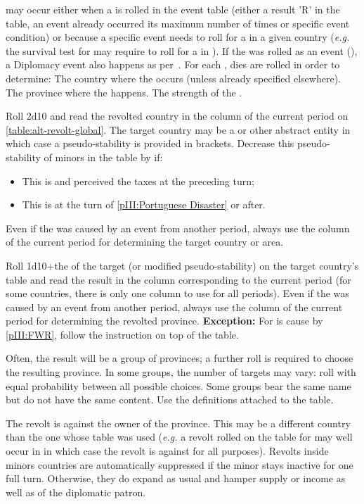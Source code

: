 \aparag \REVOLT may occur either when a \RD is rolled in the event table
(either a result 'R' in the table, an event already occurred its maximum
number of times or specific event condition) or because a specific event
needs to roll for a \REVOLT in a given country (\emph{e.g.} the survival
test for \TUR may require to roll for a \REVOLT in \paysmajeurTurquie).
\aparag If the \REVOLT was rolled as an event (\RD), a Diplomacy event
also happens as per~.
\aparag For each \REVOLT , dies are rolled in order to determine:
\bparag The country where the \REVOLT occurs (unless already specified
elsewhere).
\bparag The province where the \REVOLT happens.
\bparag The strength of the \REVOLT .

\aparag Roll 2d10 and read the revolted country in the column of the
current period on \ref{table:alt-revolt-global}. The target country may
be a \MIN or other abstract entity in which case a pseudo-stability is
provided in brackets.
\bparag Decrease this pseudo-stability of minors in the table by
 if:
\begin{itemize}
\item This is \HOLhol and \SPA perceived the taxes at the preceding
  turn;
\item This is \PORpor at the turn of \ref{pIII:Portuguese Disaster} or
  after.
\end{itemize}
\bparag Even if the \REVOLT was caused by an event from another period,
always use the column of the current period for determining the target
country or area.

\aparag Roll 1d10+the \STAB of the target (or modified
pseudo-stability) on the target country's table and read the result in
the column corresponding to the current period (for some countries,
there is only one column to use for all periods).
\bparag Even if the \REVOLT was caused by an event from another period,
always use the column of the current period for determining the revolted
province.
\bparag \textbf{Exception:} For \REVOLT is \FRA cause by \ref{pIII:FWR},
follow the instruction on top of the table.

\aparag[Groups] Often, the result will be a group of provinces; a
further roll is required to choose the resulting province.
\bparag In some groups, the number of targets may vary: roll with equal
probability between all possible choices.
\bparag Some groups bear the same name but do not have the same
content. Use the definitions attached to the table.

\aparag The revolt is against the owner of the province. This may be a
different country than the one whose table was used (\emph{e.g.} a
revolt rolled on the table for \FRA may well occur in \SPA in which case
the revolt is against \SPA for all purposes).
\bparag Revolts inside minors countries are automatically suppressed if
the minor stays inactive for one full turn. Otherwise, they do expand as
usual and hamper supply or income as well as \STAB of the diplomatic
patron.

